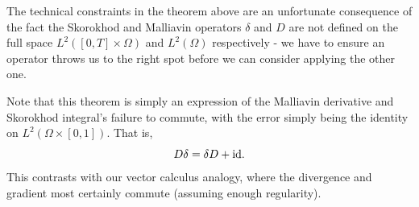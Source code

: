 \documentclass[
    a4paper,
    DIV=14,
    abstract=true,
    numbers=noenddot
]{scrartcl}
\begin{document}
\begin{remark}
	The technical constraints in the theorem above are an unfortunate
	consequence of the fact the Skorokhod and Malliavin operators $\delta$ and
	$D$ are not defined on the full space $L^2([0,T]\times\Omega)$ and
	$L^2(\Omega)$ respectively - we have to ensure an operator throws us to the
	right spot before we can consider applying the other one.

	Note that this theorem is simply an expression of the Malliavin derivative
	and Skorokhod integral's failure to commute, with the error simply being
	the identity on $L^2(\Omega \times [0, 1])$. That is,
	\[
		D\delta = \delta D + \rm{id}.
	\]
	This contrasts with our vector
	calculus analogy, where the divergence and gradient most certainly commute
	(assuming enough regularity).
\end{remark}
\end{document}
